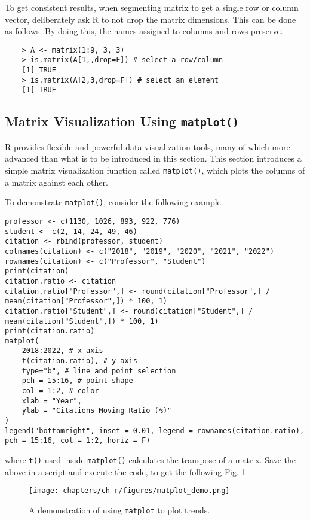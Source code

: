 To get consistent results, when segmenting matrix to get a single row or column vector, deliberately ask R to not drop the matrix dimensions. This can be done as follows. By doing this, the names assigned to columns and rows preserve.
\begin{lstlisting}
	> A <- matrix(1:9, 3, 3)
	> is.matrix(A[1,,drop=F]) # select a row/column
	[1] TRUE
	> is.matrix(A[2,3,drop=F]) # select an element
	[1] TRUE
\end{lstlisting}

\subsection{Matrix Visualization Using \texttt{matplot()}}

R provides flexible and powerful data visualization tools, many of which more advanced than what is to be introduced in this section. This section introduces a simple matrix visualization function called \verb|matplot()|, which plots the columns of a matrix against each other.

To demonstrate \verb|matplot()|, consider the following example.
\begin{lstlisting}
professor <- c(1130, 1026, 893, 922, 776)
student <- c(2, 14, 24, 49, 46)
citation <- rbind(professor, student)
colnames(citation) <- c("2018", "2019", "2020", "2021", "2022")
rownames(citation) <- c("Professor", "Student")
print(citation)
citation.ratio <- citation
citation.ratio["Professor",] <- round(citation["Professor",] / mean(citation["Professor",]) * 100, 1)
citation.ratio["Student",] <- round(citation["Student",] / mean(citation["Student",]) * 100, 1)
print(citation.ratio)
matplot(
	2018:2022, # x axis
	t(citation.ratio), # y axis
	type="b", # line and point selection
	pch = 15:16, # point shape
	col = 1:2, # color
	xlab = "Year",
	ylab = "Citations Moving Ratio (%)"
)
legend("bottomright", inset = 0.01, legend = rownames(citation.ratio), pch = 15:16, col = 1:2, horiz = F)
\end{lstlisting}
where \verb|t()| used inside \verb|matplot()| calculates the transpose of a matrix. Save the above in a script and execute the code, to get the following Fig. \ref{ch:r1:fig:matplot_demo}.
\begin{figure}
	\centering
	\texttt{[image: chapters/ch-r/figures/matplot\_demo.png]}
	\caption{A demonstration of using \texttt{matplot} to plot trends.} \label{ch:r1:fig:matplot_demo}
\end{figure}

